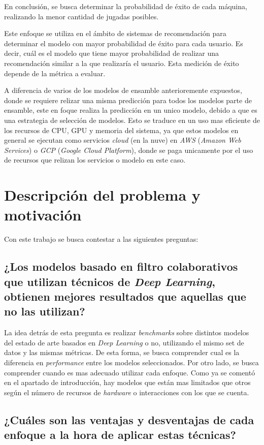 \documentclass[11pt,a4paper,twoside]{thesis}
\begin{document}
En conclusión, se busca determinar la probabilidad de éxito de cada máquina,
realizando la menor cantidad de jugadas posibles.

Este enfoque se utiliza en el ámbito de sistemas de recomendación para
determinar el modelo con mayor probabilidad de éxito para cada usuario. Es
decir, cuál es el modelo que tiene mayor probabilidad de realizar una
recomendación similar a la que realizaría el usuario. Esta medición de éxito
depende de la métrica a evaluar.

A diferencia de varios de los modelos de ensamble anterioremente expuestos,
donde se requiere relizar una misma predicción para todos los modelos parte de
ensamble, este en foque realiza la predicción en un unico modelo, debido a que
es una estrategia de selección de modelos. Esto se traduce en un uso mas
eficiente de los recursos de CPU, GPU y memoria del sistema, ya que estos
modelos en general se ejecutan como servicios \textit{cloud} (en la nuve) en
\textit{AWS} (\textit{Amazon Web Services}) o \textit{GCP} (\textit{Google
	Cloud Platform}), donde se paga unicamente por el uso de recursos que relizan
los servicios o modelo en este caso.

\clearpage
\section{Descripción del problema y motivación}

Con este trabajo se busca contestar a las siguientes preguntas:

\subsection{¿Los modelos basado en filtro colaborativos que utilizan técnicos de
	\textit{Deep Learning}, obtienen mejores resultados que aquellas que no las utilizan?}

La idea detrás de esta pregunta es realizar \textit{benchmarks} sobre distintos
modelos del estado de arte basados en \textit{Deep Learning} o no, utilizando
el mismo set de datos y las mismas métricas. De esta forma, se busca comprender
cual es la diferencia en \textit{performance} entre los modelos seleccionados.
Por otro lado, se busca comprender cuando es mas adecuado utilizar cada
enfoque. Como ya se comentó en el apartado de introducción, hay modelos que
están mas limitados que otros según el número de recursos de \textit{hardware}
o interacciones con los que se cuenta.

\subsection{¿Cuáles son las ventajas y desventajas de cada enfoque a la hora de aplicar estas técnicas?}
\end{document}

